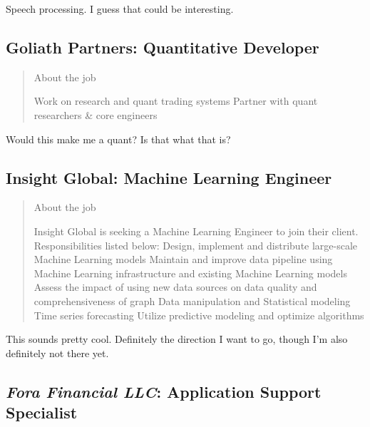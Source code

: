 \documentclass[
	letterpaper, %
	12pt, %
]{CSSullivanBusinessReport}
\begin{document}
Speech processing. I guess that could be interesting.  


\subsection[Goliath Partners]{Goliath Partners: Quantitative Developer}

\begin{quote}
	About the job
	
	Work on research and quant trading systems
	Partner with quant researchers \& core engineers

\end{quote}

Would this make me a quant? Is that what that is? 


\subsection[Insight Global]{Insight Global: Machine Learning Engineer}

\begin{quote}
	About the job
	
	Insight Global is seeking a Machine Learning Engineer to join their client. Responsibilities listed below:
	Design, implement and distribute large-scale Machine Learning models
	Maintain and improve data pipeline using Machine Learning infrastructure and existing Machine Learning models
	Assess the impact of using new data sources on data quality and comprehensiveness of graph
	Data manipulation and Statistical modeling
	Time series forecasting
	Utilize predictive modeling and optimize algorithms

\end{quote}

This sounds pretty cool. Definitely the direction I want to go, though I'm also definitely not there yet.  



\subsection[\textit{Fora Financial LLC}]{\textit{Fora Financial LLC}: Application Support Specialist}
\end{document}
